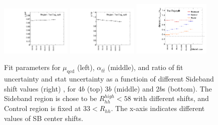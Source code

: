 \begin{figure}[htbp!]
\begin{center}
\includegraphics[width=0.3\textwidth,angle=-90]{figures/boosted/Appendix_SB/TwoTag_split_muqcdSBshift.pdf}
\includegraphics[width=0.3\textwidth,angle=-90]{figures/boosted/Appendix_SB/TwoTag_split_mutopSBshift.pdf}
\includegraphics[width=0.33\textwidth,angle=-90]{figures/boosted/Appendix_SB/data_est_TwoTag_split_sigma_compareSBshift.pdf}
  \caption{Fit parameters for $\mu_{\text{qcd}}$ (left), $\alpha_{t\bar{t}}$ (middle), and ratio of fit uncertainty and stat uncertainty as a functioin of different Sideband shift values (right) , for 4$b$ (top) 3$b$ (middle) and 2$b$s (bottom). The Sideband region is chose to be $R_{hh}^{high} < 58$ with different shifts, and Control region is fixed at $33 < R_{hh}$. The x-axis indicates different values of SB center shifts.}
  \label{fig:app-sb-muqcd-diffSBshift}
\end{center}
\end{figure}


